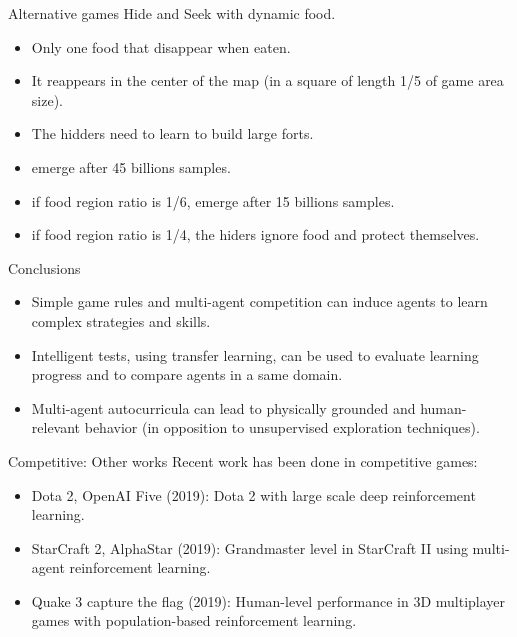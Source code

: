 \documentclass{beamer}
\begin{document}
\begin{frame}{Alternative games}
Hide and Seek with dynamic food.
    \begin{itemize}
        \item Only one food that disappear when eaten.
        \item It reappears in the center of the map (in a square of length 1/5 of game area size).
        \item The hidders need to learn to build large forts.
        \item emerge after 45 billions samples.
        \item if food region ratio is 1/6, emerge after 15 billions samples.
        \item if food region ratio is 1/4, the hiders ignore food and protect themselves.
    \end{itemize}{}
\end{frame}{}

\begin{frame}{Conclusions}
    \begin{itemize}
        \item Simple game rules and multi-agent competition can induce agents to learn complex strategies and skills.
        \item Intelligent tests, using transfer learning, can be used to evaluate learning progress and to compare agents in a same domain.
        \item Multi-agent autocurricula can lead to physically grounded and human-relevant behavior (in opposition to unsupervised exploration techniques).
    \end{itemize}{}
\end{frame}{}


\begin{frame}{Competitive: Other works}
Recent work has been done in competitive games:
 \vfill
\begin{itemize}
    \item Dota 2, OpenAI Five (2019): Dota 2 with large scale deep reinforcement learning.
     \vfill
    \item StarCraft 2, AlphaStar (2019): Grandmaster level in StarCraft II using multi-agent reinforcement learning.
     \vfill
    \item Quake 3 capture the flag (2019): Human-level performance in 3D multiplayer games with population-based reinforcement learning.
     \vfill
\end{itemize}
\end{frame}
\end{document}
